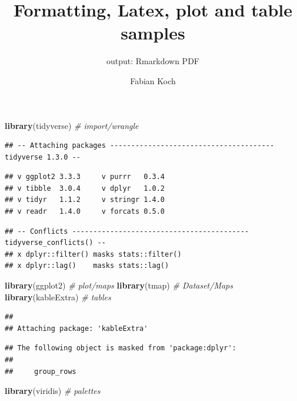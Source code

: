 \documentclass[
  twocolumn]{article}
\title{Formatting, Latex, plot and table samples}
\subtitle{output: Rmarkdown PDF}
\author{Fabian Koch}
\date{}
\newenvironment{Shaded}{\begin{snugshade}}{\end{snugshade}}
\newcommand{\CommentTok}[1]{\textcolor[rgb]{0.56,0.35,0.01}{\textit{#1}}}
\newcommand{\KeywordTok}[1]{\textcolor[rgb]{0.13,0.29,0.53}{\textbf{#1}}}
\newcommand{\NormalTok}[1]{#1}
\begin{document}
\maketitle

\onecolumn

\begin{Shaded}
\begin{Highlighting}[]
\KeywordTok{library}\NormalTok{(tidyverse) }\CommentTok{# import/wrangle}
\end{Highlighting}
\end{Shaded}

\begin{verbatim}
## -- Attaching packages --------------------------------------- tidyverse 1.3.0 --
\end{verbatim}

\begin{verbatim}
## v ggplot2 3.3.3     v purrr   0.3.4
## v tibble  3.0.4     v dplyr   1.0.2
## v tidyr   1.1.2     v stringr 1.4.0
## v readr   1.4.0     v forcats 0.5.0
\end{verbatim}

\begin{verbatim}
## -- Conflicts ------------------------------------------ tidyverse_conflicts() --
## x dplyr::filter() masks stats::filter()
## x dplyr::lag()    masks stats::lag()
\end{verbatim}

\begin{Shaded}
\begin{Highlighting}[]
\KeywordTok{library}\NormalTok{(ggplot2) }\CommentTok{# plot/maps}
\KeywordTok{library}\NormalTok{(tmap) }\CommentTok{# Dataset/Maps}
\KeywordTok{library}\NormalTok{(kableExtra) }\CommentTok{# tables}
\end{Highlighting}
\end{Shaded}

\begin{verbatim}
## 
## Attaching package: 'kableExtra'
\end{verbatim}

\begin{verbatim}
## The following object is masked from 'package:dplyr':
## 
##     group_rows
\end{verbatim}

\begin{Shaded}
\begin{Highlighting}[]
\KeywordTok{library}\NormalTok{(viridis) }\CommentTok{# palettes}
\end{Highlighting}
\end{Shaded}
\end{document}
